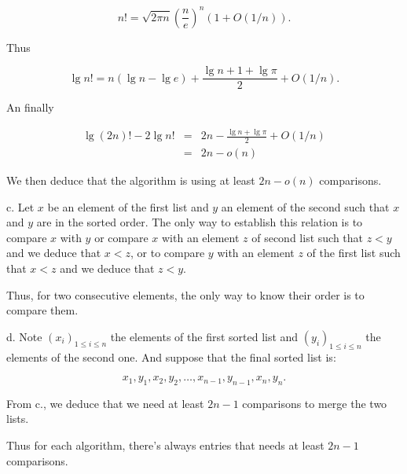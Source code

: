 \documentclass[a4paper,12pt]{article}
\newcommand{\subpar}[1]{\medskip \noindent #1.}
\begin{document}
\[ n! = \sqrt{2 \pi n} \left(\frac{n}{e}\right)^n (1 + O(1/n)).\]

Thus

\[  \lg n! = n(\lg n - \lg e) + \frac{\lg n + 1 + \lg \pi}{2} +
O(1/n).\]

An finally

\begin{eqnarray*}
  \lg(2n)! - 2\lg n! &=& 2n - \frac{\lg n + \lg \pi}{2} +
  O(1/n)\\
  &=& 2n - o(n)
\end{eqnarray*}

We then deduce that the algorithm is using at least $2n - o(n)$
comparisons.

\subpar{c} Let $x$ be an element of the first list and $y$ an element
of the second such that $x$ and $y$ are in the sorted order.  The only
way to establish this relation is to compare $x$ with $y$ or compare
$x$ with an element $z$ of second list such that $z < y$ and we deduce
that $x < z$, or to compare $y$ with an element $z$ of the first list
such that $x < z$ and we deduce that $z < y$.

Thus, for two consecutive elements, the only way to know their order
is to compare them.

\subpar{d} Note $(x_i)_{1\le i\le n}$ the elements of the first sorted
list and $(y_i)_{1\le i\le n}$ the elements of the second one.  And
suppose that the final sorted list is:

\[ x_1, y_1, x_2, y_2, \ldots, x_{n-1}, y_{n-1}, x_n, y_n .\]

From c., we deduce that we need at least $2n-1$ comparisons to merge
the two lists.

Thus for each algorithm, there's always entries that needs at least
$2n-1$ comparisons.
\end{document}
